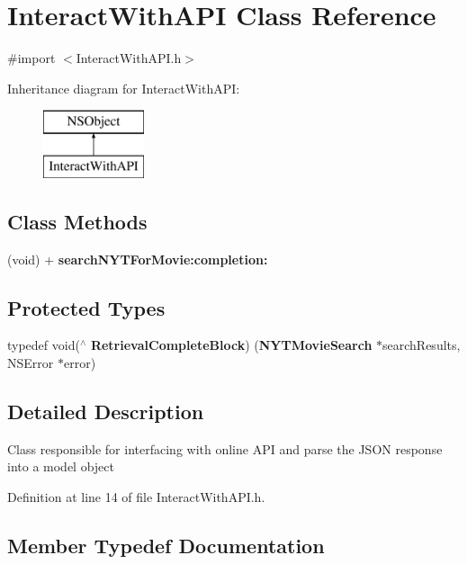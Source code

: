 \section{Interact\+With\+A\+P\+I Class Reference}
\label{interface_interact_with_a_p_i}


{\ttfamily \#import $<$Interact\+With\+A\+P\+I.\+h$>$}

Inheritance diagram for Interact\+With\+A\+P\+I\+:\begin{figure}[H]
\begin{center}
\leavevmode
\includegraphics[height=2.000000cm]{interface_interact_with_a_p_i}
\end{center}
\end{figure}
\subsection*{Class Methods}
\begin{DoxyCompactItemize}
\item 
(void) + {\bf search\+N\+Y\+T\+For\+Movie\+:completion\+:}
\end{DoxyCompactItemize}
\subsection*{Protected Types}
\begin{DoxyCompactItemize}
\item 
typedef void($^\wedge$ {\bf Retrieval\+Complete\+Block}) ({\bf N\+Y\+T\+Movie\+Search} $\ast$search\+Results, N\+S\+Error $\ast$error)
\end{DoxyCompactItemize}


\subsection{Detailed Description}
Class responsible for interfacing with online A\+P\+I and parse the J\+S\+O\+N response into a model object 

Definition at line 14 of file Interact\+With\+A\+P\+I.\+h.



\subsection{Member Typedef Documentation}
